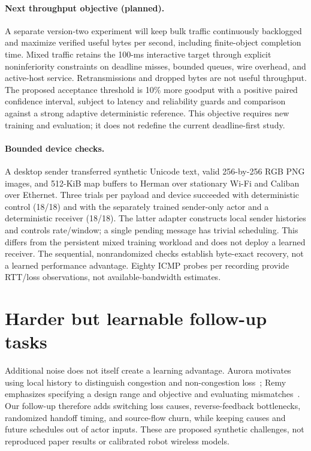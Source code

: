 \documentclass[11pt]{article}
\begin{document}
\paragraph{Next throughput objective (planned).}
A separate version-two experiment will keep bulk traffic continuously backlogged
and maximize verified useful bytes per second, including finite-object completion
time. Mixed traffic retains the 100-ms interactive target through explicit
noninferiority constraints on deadline misses, bounded queues, wire overhead, and
active-host service. Retransmissions and dropped bytes are not useful throughput.
The proposed acceptance threshold is 10\% more goodput with a positive paired
confidence interval, subject to latency and reliability guards and comparison
against a strong adaptive deterministic reference. This objective requires new
training and evaluation; it does not redefine the current deadline-first study.

\paragraph{Bounded device checks.}
A desktop sender transferred synthetic Unicode text, valid 256-by-256 RGB PNG
images, and 512-KiB map buffers to Herman over stationary Wi-Fi and Caliban over
Ethernet. Three trials per payload and device succeeded with deterministic
control (18/18) and with the separately trained sender-only actor and a
deterministic receiver (18/18). The latter adapter constructs local sender
histories and controls rate/window; a single pending message has trivial
scheduling. This differs from the persistent mixed training workload and does
not deploy a learned receiver. The sequential, nonrandomized checks establish
byte-exact recovery, not a learned performance advantage. Eighty ICMP probes per
recording provide RTT/loss observations, not available-bandwidth estimates.

\section{Harder but learnable follow-up tasks}
Additional noise does not itself create a learning advantage. Aurora motivates
using local history to distinguish congestion and non-congestion
loss~\cite{jay2019aurora}; Remy emphasizes specifying a design range and objective
and evaluating mismatches~\cite{winstein2013remy}. Our follow-up therefore adds
switching loss causes, reverse-feedback bottlenecks, randomized handoff timing,
and source-flow churn, while keeping causes and future schedules out of actor
inputs. These are proposed synthetic challenges, not reproduced paper results
or calibrated robot wireless models.
\end{document}
